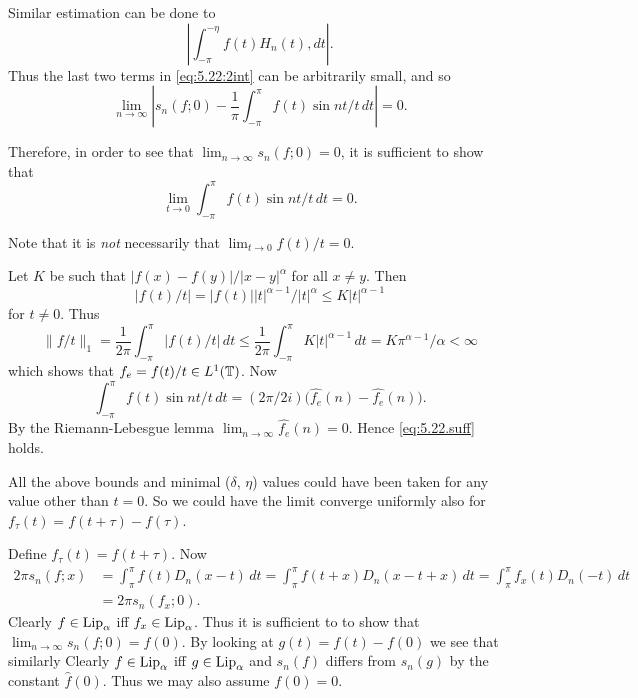 \begin{enumerate}
Similar estimation can be done to 
\begin{equation*}
\left|\int_{-\pi}^{-\eta} f(t)H_n(t),dt\right|.
\end{equation*}
Thus the last two terms in \eqref{eq:5.22:2int} can be arbitrarily small,
and so 
\begin{equation*}
\lim_{n\to\infty}
  \left|s_n(f;0) - \frac{1}{\pi}\int_{-\pi}^\pi f(t)\sin nt/t\,dt \right| = 0.
\end{equation*}

Therefore, in order to see that \(\lim_{n\to\infty} s_n(f;0)=0\), 
it is sufficient to show that 
\begin{equation} \label{eq:5.22.suff}
\lim_{t\to 0} \int_{-\pi}^\pi f(t)\sin nt/t\,dt = 0.
\end{equation}

{\small
Note that it is \emph{not} necessarily that \(\lim_{t\to 0}f(t)/t = 0\).
}

Let $K$ be such that \(|f(x)-f(y)|/|x-y|^\alpha\) for all \(x\neq y\).
Then 
\begin{equation*}
|f(t)/t| 
= |f(t)| |t|^{\alpha-1}/|t|^\alpha
\leq K |t|^{\alpha-1}
\end{equation*}
for \(t\neq 0\). Thus
\begin{equation*}
\|f/t\|_1
= \frac{1}{2\pi} \int_{-\pi}^\pi |f(t)/t|\,dt 
\leq \frac{1}{2\pi} \int_{-\pi}^\pi K|t|^{\alpha-1}\,dt 
= K\pi^{\alpha-1}/\alpha < \infty
\end{equation*}
which shows that \(f_e = f(t)/t \in L^1(\mathbb{T})\).
Now
\begin{equation*}
\int_{-\pi}^\pi f(t)\sin nt/t\,dt 
= (2\pi/2i)\bigl(\hat{f_e}(n) - \hat{f_e}(n)\bigr).
\end{equation*}
By the Riemann-Lebesgue lemma \(\lim_{n\to\infty} \hat{f_e}(n) = 0\).
Hence \eqref{eq:5.22.suff} holds.

All the above bounds and minimal (\(\delta\), \(\eta\)) values
could have been taken for any value other than \(t=0\).
So we could have the limit converge uniformly
also for \(f_{\tau}(t) = f(t+\tau) - f(\tau)\).


\iffalse
Define \(f_\tau(t) = f(t + \tau)\).
Now 
\begin{align*}
2\pi s_n(f;x)
&= \int_{\pi}^\pi f(t)D_n(x - t)\,dt
 = \int_{\pi}^\pi f(t+x)D_n(x - t + x)\,dt
 = \int_{\pi}^\pi f_x(t)D_n(-t)\,dt \\
& = 2\pi s_n(f_x;0).
\end{align*}
Clearly \(f\in\mathop{\rm Lip}\nolimits_\alpha\) iff  \(f_x\in\mathop{\rm Lip}\nolimits_\alpha\).
Thus it is sufficient to to show that \(\lim_{n\to\infty} s_n(f;0) = f(0)\).
By looking at \(g(t) = f(t) - f(0)\) we see that 
similarly 
Clearly \(f\in\mathop{\rm Lip}\nolimits_\alpha\) iff  \(g\in\mathop{\rm Lip}\nolimits_\alpha\)
and \(s_n(f)\) differs from \(s_n(g)\) by the constant \(\hat{f}(0)\).
Thus we may also assume \(f(0)=0\).


\end{enumerate}
